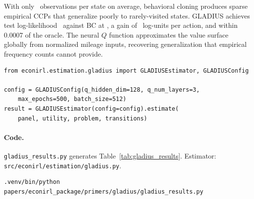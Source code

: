 \documentclass[10pt]{article}
\begin{document}
With only \gladObsPerState\ observations per state on average, behavioral cloning produces sparse empirical CCPs that generalize poorly to rarely-visited states. GLADIUS achieves test log-likelihood \gladTestLL\ against BC at \gladBCTestLL, a gain of \gladLLgain\ log-units per action, and within 0.0007 of the oracle. The neural $Q$ function approximates the value surface globally from normalized mileage inputs, recovering generalization that empirical frequency counts cannot provide.

\begin{lstlisting}[basicstyle=\footnotesize\ttfamily]
from econirl.estimation.gladius import GLADIUSEstimator, GLADIUSConfig

config = GLADIUSConfig(q_hidden_dim=128, q_num_layers=3,
    max_epochs=500, batch_size=512)
result = GLADIUSEstimator(config=config).estimate(
    panel, utility, problem, transitions)
\end{lstlisting}

\paragraph{Code.}
\texttt{gladius\_results.py} generates Table~\ref{tab:gladius_results}. Estimator: \texttt{src/econirl/estimation/gladius.py}.
\begin{verbatim}
.venv/bin/python papers/econirl_package/primers/gladius/gladius_results.py
\end{verbatim}




\end{document}
